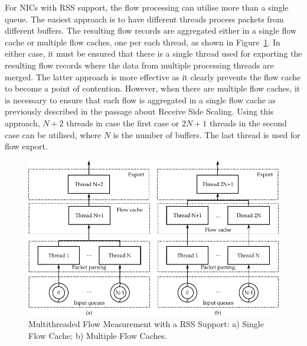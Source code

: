 For NICs with RSS support, the flow processing can utilise more than a single queue. The easiest approach is to have different threads process packets from different buffers. The resulting flow records are aggregated either in a single flow cache or multiple flow caches, one per each thread, as shown in Figure~\ref{fig:exporter-thread-schema}. In either case, it must be ensured that there is a single thread used for exporting the resulting flow records where the data from multiple processing threads are merged. The latter approach is more effective as it clearly prevents the flow cache to become a point of contention. However, when there are multiple flow caches, it is necessary to ensure that each flow is aggregated in a single flow cache as previously described in the passage about Receive Side Scaling. Using this approach, $N+2$ threads in case the first case or $2N+1$ threads in the second case can be utilised, where $N$ is the number of buffers. The last thread is used for flow export. 

\begin{figure}[t!]
  \begin{center}
    \includegraphics{figures/c05/exporter-thread-schema}
  \end{center}
  \caption{Multithreaded Flow Measurement with a RSS Support: a) Single Flow Cache; b) Multiple Flow Caches.}
  \label{fig:exporter-thread-schema}
\end{figure}

